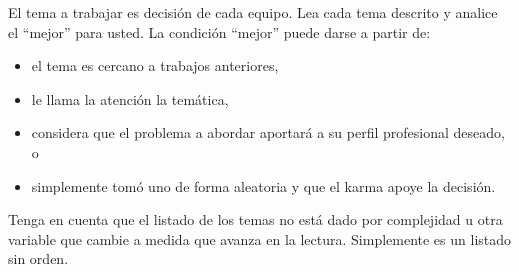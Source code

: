 \documentclass[10pt]{article}
\begin{document}
		El tema a trabajar es decisión de cada equipo. Lea cada tema descrito y analice el ``mejor'' para usted. La condición ``mejor'' puede darse a partir de:
		\begin{itemize}
			\item el tema es cercano a trabajos anteriores,
			\item le llama la atención la temática,
			\item considera que el problema a abordar aportará a su perfil profesional deseado, o 
			\item simplemente tomó uno de forma aleatoria y que el karma apoye la decisión.
		\end{itemize}
		
		Tenga en cuenta que el listado de los temas no está dado por complejidad u otra variable que cambie a medida que avanza en la lectura. Simplemente es un listado sin orden.
		
\end{document}
